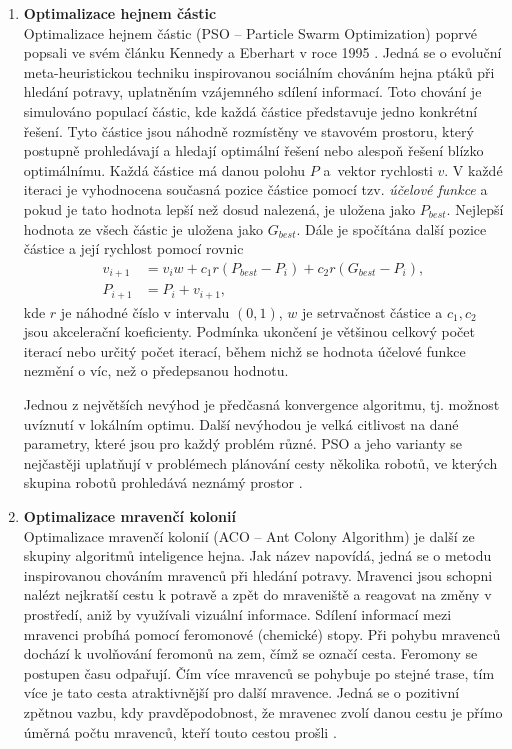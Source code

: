\begin{enumerate}
	\item \textbf{Optimalizace hejnem částic}\\
	Optimalizace hejnem částic (PSO -- Particle Swarm Optimization) poprvé popsali ve svém článku Kennedy a Eberhart v roce 1995 \cite{Kennedy1995}. Jedná se o evoluční meta-heuristickou techniku inspirovanou sociálním chováním hejna ptáků při hledání potravy, uplatněním vzájemného sdílení informací. Toto chování je simulováno populací částic, kde každá částice představuje jedno konkrétní řešení. Tyto částice jsou náhodně rozmístěny ve stavovém prostoru, který postupně prohledávají a hledají optimální řešení nebo alespoň řešení blízko optimálnímu. Každá částice má danou polohu $P$ a~vektor rychlosti $v$. V každé iteraci je vyhodnocena současná pozice částice pomocí tzv. \emph{účelové funkce} a pokud je tato hodnota lepší než dosud nalezená, je uložena jako $P_{best}$. Nejlepší hodnota ze všech částic je uložena jako $G_{best}$. Dále je spočítána další pozice částice a její rychlost pomocí rovnic
	\begin{subequations}
		\begin{align}
		v_{i+1}&=v_iw+c_1r(P_{best}-P_i)+c_2r(G_{best}-P_i),\\
		P_{i+1}&=P_i+v_{i+1},
		\end{align}
	\end{subequations}
	kde $r$ je náhodné číslo v intervalu $(0,1)$, $w$ je setrvačnost částice a $c_1,c_2$ jsou akcelerační koeficienty. Podmínka ukončení je většinou celkový počet iterací nebo určitý počet iterací, během nichž se hodnota účelové funkce nezmění o víc, než o předepsanou hodnotu.
	
	Jednou z největších nevýhod je předčasná konvergence algoritmu, tj. možnost uvíznutí v lokálním optimu. Další nevýhodou je velká citlivost na dané parametry, které jsou pro každý problém různé. PSO a jeho varianty se nejčastěji uplatňují v problémech plánování cesty několika robotů, ve kterých skupina robotů prohledává neznámý prostor \cite{Asma2017,Masehian2007,Nakisa20140901}.
	
	\item \textbf{Optimalizace mravenčí kolonií}\\
	Optimalizace mravenčí kolonií (ACO -- Ant Colony Algorithm) je další ze skupiny algoritmů inteligence hejna. Jak název napovídá, jedná se o metodu inspirovanou chováním mravenců při hledání potravy. Mravenci jsou schopni nalézt nejkratší cestu k potravě a zpět do mraveniště a reagovat na změny v prostředí, aniž by využívali vizuální informace. Sdílení informací mezi mravenci probíhá pomocí feromonové (chemické) stopy. Při pohybu mravenců dochází k uvolňování feromonů na zem, čímž se označí cesta. Feromony se postupen času odpařují. Čím více mravenců se pohybuje po stejné trase, tím více je tato cesta atraktivnější pro další mravence. Jedná se o pozitivní zpětnou vazbu, kdy pravděpodobnost, že mravenec zvolí danou cestu je přímo úměrná počtu mravenců, kteří touto cestou prošli \cite{Liu2006}.
	 

\end{enumerate}
